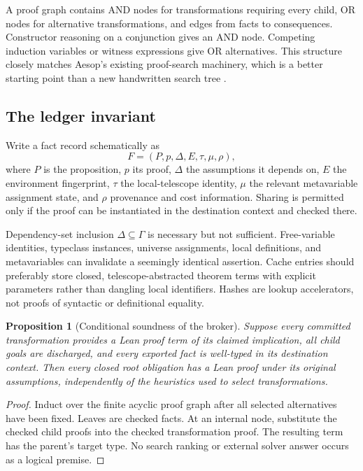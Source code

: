 \documentclass[11pt,a4paper]{article}
\newtheorem{proposition}{Proposition}[section]
\begin{document}
A proof graph contains AND nodes for transformations requiring every child, OR nodes for alternative transformations, and edges from facts to consequences. Constructor reasoning on a conjunction gives an AND node. Competing induction variables or witness expressions give OR alternatives. This structure closely matches Aesop's existing proof-search machinery, which is a better starting point than a new handwritten search tree \cite{aesop}.

\subsection{The ledger invariant}
Write a fact record schematically as
\[
 F=(P,p,\Delta,E,\tau,\mu,\rho),
\]
where $P$ is the proposition, $p$ its proof, $\Delta$ the assumptions it depends on, $E$ the environment fingerprint, $\tau$ the local-telescope identity, $\mu$ the relevant metavariable assignment state, and $\rho$ provenance and cost information. Sharing is permitted only if the proof can be instantiated in the destination context and checked there.

Dependency-set inclusion $\Delta\subseteq\Gamma$ is necessary but not sufficient. Free-variable identities, typeclass instances, universe assignments, local definitions, and metavariables can invalidate a seemingly identical assertion. Cache entries should preferably store closed, telescope-abstracted theorem terms with explicit parameters rather than dangling local identifiers. Hashes are lookup accelerators, not proofs of syntactic or definitional equality.

\begin{proposition}[Conditional soundness of the broker]
Suppose every committed transformation provides a Lean proof term of its claimed implication, all child goals are discharged, and every exported fact is well-typed in its destination context. Then every closed root obligation has a Lean proof under its original assumptions, independently of the heuristics used to select transformations.
\end{proposition}
\begin{proof}
Induct over the finite acyclic proof graph after all selected alternatives have been fixed. Leaves are checked facts. At an internal node, substitute the checked child proofs into the checked transformation proof. The resulting term has the parent's target type. No search ranking or external solver answer occurs as a logical premise.
\end{proof}
\end{document}
